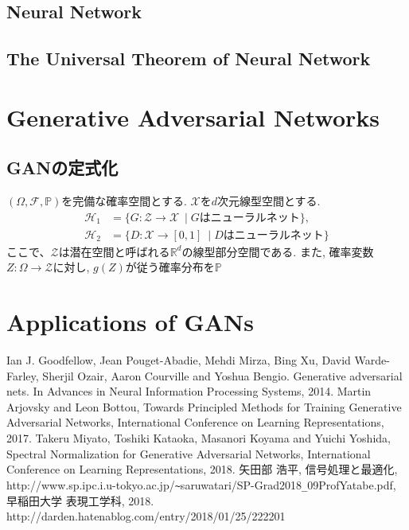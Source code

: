 \documentclass[11pt, a4paper, dvipdfmx]{jsarticle}
\theoremstyle{definition}
\newcommand{\R}{\mathbb{R}}
\newcommand{\F}{\mathcal{F}}
\newcommand{\X}{\mathcal{X}}
\newcommand{\Hil}{\mathcal{H}}
\renewcommand{\P}{\mathbb{P}}
\newcommand{\Probsp}{(\Omega, \F, \P)}
\begin{document}
\subsection{Neural Network}
\subsection{The Universal Theorem of Neural Network}
\section{Generative Adversarial Networks}
\subsection{GANの定式化}
$\Probsp$を完備な確率空間とする.  
$\X$を$d$次元線型空間とする. 
\begin{align*}
    \Hil_1 &= \{G:\mathcal{Z}\to\X~\mid G\text{はニューラルネット}\},\\
    \Hil_{2} &= \{D:\X\to [0, 1]~\mid D\text{はニューラルネット}\}
\end{align*}
ここで、$\mathcal{Z}$は潜在空間と呼ばれる$\R^{d}$の線型部分空間である.
また, 確率変数$Z:\Omega\to\mathcal{Z}$に対し, $g(Z)$が従う確率分布を$\mathbb{P}_{}$
\section{Applications of GANs}

\begin{thebibliography}{20}
     Ian J. Goodfellow, Jean Pouget-Abadie, Mehdi Mirza, Bing Xu, David Warde-Farley, Sherjil Ozair, Aaron Courville and Yoshua Bengio. 
    Generative adversarial nets. In Advances in Neural Information Processing Systems, 2014.
    Martin Arjovsky and Leon Bottou, Towards Principled Methods for Training Generative Adversarial Networks,
    International Conference on Learning Representations, 2017.
    Takeru Miyato, Toshiki Kataoka, Masanori Koyama and Yuichi Yoshida, Spectral Normalization for Generative Adversarial Networks, 
    International Conference on Learning Representations, 2018.
    \bibitem{} 矢田部 浩平, 信号処理と最適化, http://www.sp.ipc.i.u-tokyo.ac.jp/\verb|~|saruwatari/SP-Grad2018\verb|_|09ProfYatabe.pdf, 早稲田大学 表現工学科, 2018.
    \bibitem{} http://darden.hatenablog.com/entry/2018/01/25/222201
\end{thebibliography}
\end{document}
